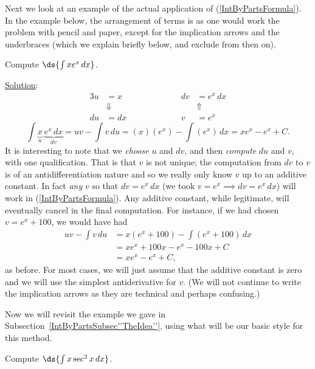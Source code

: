 Next we look at an example of the actual application of
(\ref{IntByPartsFormula}).  In the example below, the arrangement of terms
is as one would work the problem with pencil and paper, except for
the implication arrows and the underbraces (which we explain briefly below,
and exclude from then on).

\bex Compute $\ds{\int xe^x\,dx}$.

\underline{Solution}:
\begin{alignat*}{3}
u&=x&&\qquad\qquad& dv&=e^x\,dx\\
&\Downarrow&&&&\Uparrow\\
du&=dx&&&v&=e^x
\end{alignat*}
$$\int\underbrace{x}_{u}\ \underbrace{e^x\,dx}_{dv}
=uv-\int v\,du
=(x)(e^x)-\int(e^x)\,dx
=xe^x-e^x+C.$$
\eex
 It is interesting to note
that we {\it choose} $u$ and $dv$, and then {\it compute}
$du$ and $v$, with one qualification.  That is that
$v$ is not unique;  the computation from $dv$ to $v$ is
of an antidifferentiation nature and so we really only know $v$
up to an additive constant.  In fact {\it any} $v$ so that $dv=e^x\,dx$
(we took $v=e^x\implies dv=e^x\,dx$)
will work in (\ref{IntByPartsFormula}).  Any additive constant,
while legitimate, will eventually cancel in the final computation.
For instance, if we had chosen $v=e^x+100$, we would have had
\begin{align*}
uv-\int v\,du&=x(e^x+100)-\int(e^x+100)\,dx\\
               &=xe^x+100x-e^x-100x+C\\
              &=xe^x-e^x+C,
\end{align*}
as before.  For most cases, we will just assume that the additive
constant is zero and we will use the simplest antiderivative for $v$.
(We will not continue to write the implication arrows as they 
are technical and perhaps confusing.)

Now we will revisit the example we gave in
Subsection~\ref{IntByPartsSubsec''TheIdea''}, using what will be our
basic style for this method.

\bex Compute $\ds{\int x\sec^2x\,dx}$.

